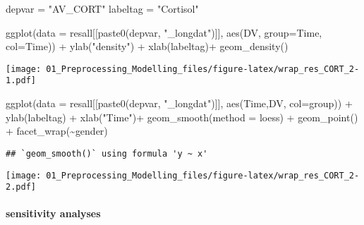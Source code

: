 \documentclass[
]{article}
\newenvironment{Shaded}{\begin{snugshade}}{\end{snugshade}}
\newcommand{\AttributeTok}[1]{\textcolor[rgb]{0.77,0.63,0.00}{#1}}
\newcommand{\FunctionTok}[1]{\textcolor[rgb]{0.00,0.00,0.00}{#1}}
\newcommand{\NormalTok}[1]{#1}
\newcommand{\OtherTok}[1]{\textcolor[rgb]{0.56,0.35,0.01}{#1}}
\newcommand{\SpecialCharTok}[1]{\textcolor[rgb]{0.00,0.00,0.00}{#1}}
\newcommand{\StringTok}[1]{\textcolor[rgb]{0.31,0.60,0.02}{#1}}
\begin{document}
\begin{Shaded}
\begin{Highlighting}[]
\NormalTok{depvar }\OtherTok{=} \StringTok{"AV\_CORT"}
\NormalTok{labeltag }\OtherTok{=} \StringTok{"Cortisol"}

\FunctionTok{ggplot}\NormalTok{(}\AttributeTok{data =}\NormalTok{ resall[[}\FunctionTok{paste0}\NormalTok{(depvar, }\StringTok{"\_longdat"}\NormalTok{)]], }
       \FunctionTok{aes}\NormalTok{(DV, }\AttributeTok{group=}\NormalTok{Time, }\AttributeTok{col=}\NormalTok{Time)) }\SpecialCharTok{+} 
  \FunctionTok{ylab}\NormalTok{(}\StringTok{"density"}\NormalTok{) }\SpecialCharTok{+} \FunctionTok{xlab}\NormalTok{(labeltag)}\SpecialCharTok{+}
  \FunctionTok{geom\_density}\NormalTok{()}
\end{Highlighting}
\end{Shaded}

\texttt{[image: 01\_Preprocessing\_Modelling\_files/figure-latex/wrap\_res\_CORT\_2-1.pdf]}

\begin{Shaded}
\begin{Highlighting}[]
\FunctionTok{ggplot}\NormalTok{(}\AttributeTok{data =}\NormalTok{ resall[[}\FunctionTok{paste0}\NormalTok{(depvar, }\StringTok{"\_longdat"}\NormalTok{)]], }
       \FunctionTok{aes}\NormalTok{(Time,DV, }\AttributeTok{col=}\NormalTok{group)) }\SpecialCharTok{+} 
  \FunctionTok{ylab}\NormalTok{(labeltag) }\SpecialCharTok{+} \FunctionTok{xlab}\NormalTok{(}\StringTok{"Time"}\NormalTok{)}\SpecialCharTok{+}
  \FunctionTok{geom\_smooth}\NormalTok{(}\AttributeTok{method =} \StringTok{\textquotesingle{}loess\textquotesingle{}}\NormalTok{) }\SpecialCharTok{+} \FunctionTok{geom\_point}\NormalTok{() }\SpecialCharTok{+}   \FunctionTok{facet\_wrap}\NormalTok{(}\SpecialCharTok{\textasciitilde{}}\NormalTok{gender)}
\end{Highlighting}
\end{Shaded}

\begin{verbatim}
## `geom_smooth()` using formula 'y ~ x'
\end{verbatim}

\texttt{[image: 01\_Preprocessing\_Modelling\_files/figure-latex/wrap\_res\_CORT\_2-2.pdf]}

\hypertarget{sensitivity-analyses-1}{%
\paragraph{sensitivity analyses}\label{sensitivity-analyses-1}}
\end{document}
